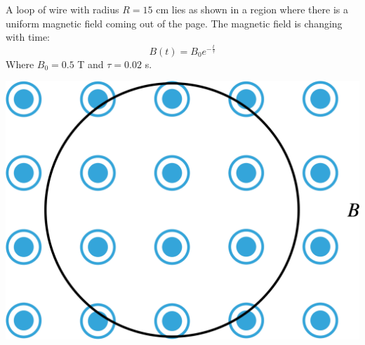 \question[20] A loop of wire with radius $R=15$ cm lies as shown in a region where there is a uniform magnetic field coming out of the page. The magnetic field is changing with time:
\begin{equation*}
	B(t)=B_0 e^{-\frac{t}{\tau}}
\end{equation*}
Where $B_0=0.5$ T and $\tau=0.02$ s.

\begin{center}
	\includegraphics[width=.4\textwidth]{faraday.pdf}
\end{center}

